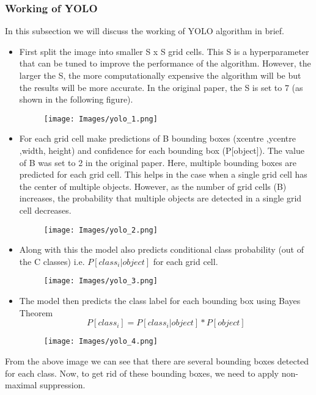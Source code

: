 \documentclass[conference]{IEEEtran}
\begin{document}
\subsubsection*{\textbf{Working of YOLO}}
In this subsection we will discuss the working of YOLO algorithm in brief.
\begin{itemize}
  \item First split the image into smaller S x S grid cells. This S is a hyperparameter that can be tuned to improve the performance of the algorithm. However, the larger the S, the more computationally expensive the algorithm will be but the results will be more accurate. In the original paper, the S is set to 7 (as shown in the following figure).
        \begin{figure}[H]
          \centering
          \texttt{[image: Images/yolo\_1.png]}
        \end{figure}
  \item For each grid cell make predictions of B bounding boxes (xcentre ,ycentre ,width, height) and confidence for each bounding box (P[object]). The value of B was set to 2 in the original paper. Here, multiple bounding boxes are predicted for each grid cell. This helps in the case when a single grid cell has the center of multiple objects. However, as the number of grid cells (B) increases, the probability that multiple objects are detected in a single grid cell decreases.
        \begin{figure}[H]
          \centering
          \texttt{[image: Images/yolo\_2.png]}
        \end{figure}
  \item Along with this the model also predicts conditional class probability (out of the C classes) i.e. $P[class_i|object]$ for each grid cell.
        \begin{figure}[H]
          \centering
          \texttt{[image: Images/yolo\_3.png]}
        \end{figure}
  \item The model then predicts the class label for each bounding box using Bayes Theorem
        \begin{equation*}
          P[class_i] = P[class_i|object] * P[object]
        \end{equation*}
        \begin{figure}[H]
          \centering
          \texttt{[image: Images/yolo\_4.png]}
        \end{figure}
\end{itemize}
From the above image we can see that there are several bounding boxes detected for each class. Now, to get rid of these bounding boxes, we need to apply non-maximal suppression.
\end{document}
